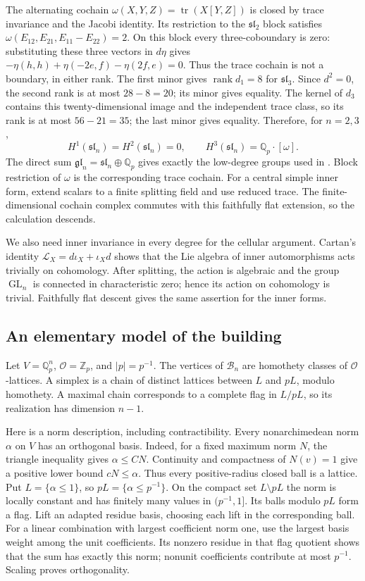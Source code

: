 \documentclass[11pt]{article}
\numberwithin{equation}{section}
\theoremstyle{definition}
\theoremstyle{remark}
\newcommand{\Q}{\mathbb Q}
\newcommand{\Z}{\mathbb Z}
\newcommand{\cO}{\mathcal O}
\DeclareMathOperator{\GL}{GL}
\DeclareMathOperator{\tr}{tr}
\DeclareMathOperator{\rank}{rank}
\begin{document}
The alternating cochain $\omega(X,Y,Z)=\tr(X[Y,Z])$ is closed by
trace invariance and the Jacobi identity.  Its restriction to the
$\mathfrak{sl}_2$ block satisfies
$\omega(E_{12},E_{21},E_{11}-E_{22})=2$.  On this block every
three-coboundary is zero: substituting these three vectors in $d\eta$
gives
$-\eta(h,h)+\eta(-2e,f)-\eta(2f,e)=0$.
Thus the trace cochain is not a boundary, in either rank.
The first minor gives $\rank d_1=8$ for $\mathfrak{sl}_3$.
Since $d^2=0$, the second rank is at most $28-8=20$; its minor gives
equality.  The kernel of $d_3$ contains this twenty-dimensional image
and the independent trace class, so its rank is at most $56-21=35$;
the last minor gives equality.  Therefore, for $n=2,3$,
\[
 H^1(\mathfrak{sl}_n)=H^2(\mathfrak{sl}_n)=0,
 \qquad H^3(\mathfrak{sl}_n)=\Q_p\cdot[\omega].
\]
The direct sum $\mathfrak{gl}_n=\mathfrak{sl}_n\oplus\Q_p$ gives
exactly the low-degree groups used in .
Block restriction of $\omega$ is the corresponding trace cochain.
For a central simple inner form, extend scalars to a finite splitting
field and use reduced trace.  The finite-dimensional cochain complex
commutes with this faithfully flat extension, so the calculation descends.

We also need inner invariance in every degree for the cellular argument.
Cartan's identity $\mathcal L_X=d\iota_X+\iota_Xd$ shows that the Lie
algebra of inner automorphisms acts trivially on cohomology.  After
splitting, the action is algebraic and the group $\GL_n$ is connected
in characteristic zero; hence its action on cohomology is trivial.
Faithfully flat descent gives the same assertion for the inner forms.

\subsection{An elementary model of the building}
\label{app:building}

Let $V=\Q_p^n$, $\cO=\Z_p$, and $|p|=p^{-1}$.  The vertices of
$\mathcal B_n$ are homothety classes of $\cO$-lattices.  A simplex is a
chain of distinct lattices between $L$ and $pL$, modulo homothety.
A maximal chain corresponds to a complete flag in $L/pL$, so its
realization has dimension $n-1$.

Here is a norm description, including contractibility.  Every
nonarchimedean norm $\alpha$ on $V$ has an orthogonal basis.
Indeed, for a fixed maximum norm $N$, the triangle inequality gives
$\alpha\le CN$.  Continuity and compactness of $N(v)=1$ give a positive
lower bound $cN\le\alpha$.  Thus every positive-radius closed ball is
a lattice.  Put $L=\{\alpha\le1\}$, so $pL=\{\alpha\le p^{-1}\}$.
On the compact set $L\setminus pL$ the norm is locally constant and
has finitely many values in $(p^{-1},1]$.  Its balls modulo $pL$ form
a flag.  Lift an adapted residue basis, choosing each lift in the
corresponding ball.  For a linear combination with largest coefficient
norm one, use the largest basis weight among the unit coefficients.
Its nonzero residue in that flag quotient shows that the sum has
exactly this norm; nonunit coefficients contribute at most $p^{-1}$.  Scaling
proves orthogonality.
\end{document}

